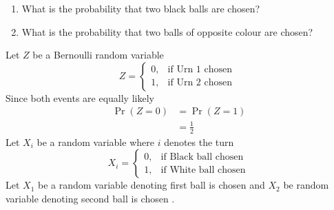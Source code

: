 \documentclass[journal,12pt,twocolumn]{IEEEtran}
\providecommand{\pr}[1]{\ensuremath{\Pr\left(#1\right)}}
\begin{document}
\begin{enumerate}[label=(\alph*)]
\item What is the probability that two black balls are chosen?

\item What is the probability that two balls of opposite colour are chosen?
\end{enumerate}


\solution

Let $Z$ be a Bernoulli random variable
 \begin{equation}
    Z=
    \begin{cases}
      0, & \text{if Urn 1 chosen }\\
      1, & \text{if Urn 2 chosen}
    \end{cases}
  \end{equation}
  Since both events are equally likely
  \begin{align}
  \pr{Z=0} &= \pr{Z=1}\\
         &=\frac{1}{2}
  \end{align}
  Let $X_i$ be a random variable 
  where $i$ denotes the turn
  \begin{equation}
    X_i=
    \begin{cases}
      0, & \text{if Black ball chosen }\\
      1, & \text{if White ball chosen}
    \end{cases}
  \end{equation}
Let $X_1$ be a random variable denoting first ball is chosen and
 $X_2$ be random variable denoting second ball is chosen .
 
 

\begin{table}[ht!]
		\centering
		
		\caption{}
		\label{table:table1}	
	\end{table}
\end{document}

